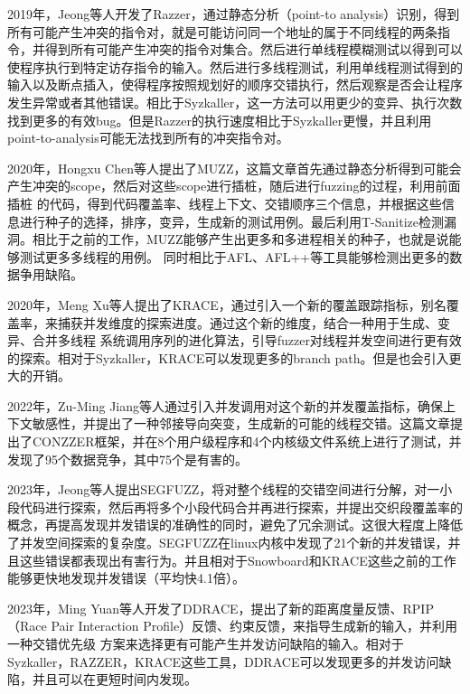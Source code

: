 2019年，Jeong\cite{jeong2019razzer}等人开发了Razzer，通过静态分析（point-to analysis）识别，得到所有可能产生冲突的指令对，就是可能访问同一个地址的属于不同线程的两条指令，并得到所有可能产生冲突的指令对集合。然后进行单线程模糊测试以得到可以使程序执行到特定访存指令的输入。然后进行多线程测试，利用单线程测试得到的输入以及断点插入，使得程序按照规划好的顺序交错执行，然后观察是否会让程序发生异常或者其他错误。相比于Syzkaller，这一方法可以用更少的变异、执行次数找到更多的有效bug。但是Razzer的执行速度相比于Syzkaller更慢，并且利用point-to-analysis可能无法找到所有的冲突指令对。

2020年，Hongxu Chen\cite{chen2020muzz}等人提出了MUZZ，这篇文章首先通过静态分析得到可能会产生冲突的scope，然后对这些scope进行插桩，随后进行fuzzing的过程，利用前面插桩 的代码，得到代码覆盖率、线程上下文、交错顺序三个信息，并根据这些信息进行种子的选择，排序，变异，生成新的测试用例。最后利用T-Sanitize检测漏洞。相比于之前的工作，MUZZ能够产生出更多和多进程相关的种子，也就是说能够测试更多多线程的用例。 同时相比于AFL\cite{githubGitHubGoogleAFL}、AFL++\cite{fioraldi2020afl++}等工具能够检测出更多的数据争用缺陷。

2020年，Meng Xu\cite{xu2020krace}等人提出了KRACE，通过引入一个新的覆盖跟踪指标，别名覆盖率，来捕获并发维度的探索进度。通过这个新的维度，结合一种用于生成、变异、合并多线程 系统调用序列的进化算法，引导fuzzer对线程并发空间进行更有效的探索。相对于Syzkaller，KRACE可以发现更多的branch path。但是也会引入更大的开销。 

2022年，Zu-Ming Jiang\cite{jiang2022context}等人通过引入并发调用对这个新的并发覆盖指标，确保上 下文敏感性，并提出了一种邻接导向突变，生成新的可能的线程交错。这篇文章提出了CONZZER框架，并在8个用户级程序和4个内核级文件系统上进行了测试，并发现了95个数据竞争，其中75个是有害的。 

2023年，Jeong等人提出SEGFUZZ\cite{jeong2023segfuzz}，将对整个线程的交错空间进行分解，对一小段代码进行探索，然后再将多个小段代码合并再进行探索，并提出交织段覆盖率的概念，再提高发现并发错误的准确性的同时，避免了冗余测试。这很大程度上降低了并发空间探索的复杂度。SEGFUZZ在linux内核中发现了21个新的并发错误，并且这些错误都表现出有害行为。并且相对于Snowboard和KRACE这些之前的工作能够更快地发现并发错误（平均快4.1倍）。 

2023年，Ming Yuan等人开发了DDRACE\cite{yuan2023ddrace}，提出了新的距离度量反馈、RPIP（Race Pair Interaction Profile）反馈、约束反馈，来指导生成新的输入，并利用一种交错优先级 方案来选择更有可能产生并发访问缺陷的输入。相对于Syzkaller，RAZZER，KRACE这些工具，DDRACE可以发现更多的并发访问缺陷，并且可以在更短时间内发现。

